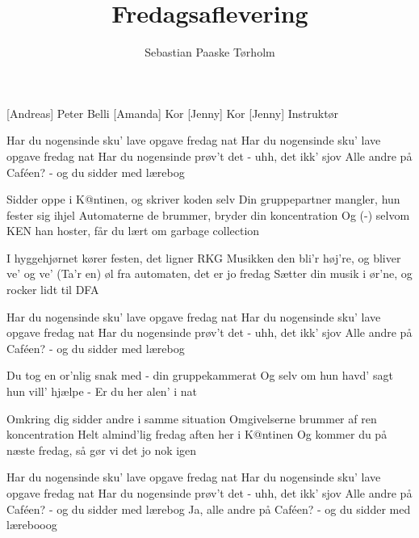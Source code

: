 \documentclass[a4paper,11pt]{article}
\title{Fredagsaflevering}
\author{Sebastian Paaske Tørholm}
\begin{document}
\maketitle

\begin{roles}
[Andreas] Peter Belli
[Amanda] Kor
[Jenny] Kor
[Jenny] Instruktør
\end{roles}

\begin{song}
%
Har du nogensinde sku' lave opgave fredag nat
Har du nogensinde sku' lave opgave fredag nat
Har du nogensinde prøv't det - uhh, det ikk' sjov
Alle andre på Caféen? - og du sidder med lærebog

Sidder oppe i K@ntinen, og skriver koden selv
Din gruppepartner mangler, hun fester sig ihjel
Automaterne de brummer, bryder din koncentration
Og (-) selvom KEN han hoster, får du lært om garbage collection

I hyggehjørnet kører festen, det ligner RKG
Musikken den bli'r høj're, og bliver ve' og ve'
(Ta'r en) øl fra automaten, det er jo fredag
Sætter din musik i ør'ne, og rocker lidt til DFA

Har du nogensinde sku' lave opgave fredag nat
Har du nogensinde sku' lave opgave fredag nat
Har du nogensinde prøv't det - uhh, det ikk' sjov
Alle andre på Caféen? - og du sidder med lærebog

Du tog en or'nlig snak med - din gruppekammerat
Og selv om hun havd' sagt hun vill' hjælpe - Er du her alen' i nat

Omkring dig sidder andre i samme situation
Omgivelserne brummer af ren koncentration
Helt almind'lig fredag aften her i K@ntinen
Og kommer du på næste fredag, så gør vi det jo nok igen

Har du nogensinde sku' lave opgave fredag nat
Har du nogensinde sku' lave opgave fredag nat
Har du nogensinde prøv't det - uhh, det ikk' sjov
Alle andre på Caféen? - og du sidder med lærebog
Ja, alle andre på Caféen? - og du sidder med lærebooog

\end{song}
\end{document}
